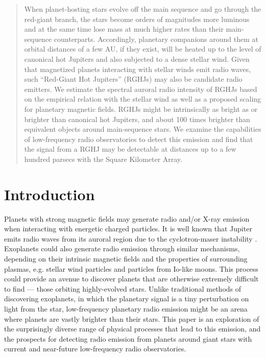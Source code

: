 \documentclass[iop,numberedappendix,apj,twocolappendix,]{emulateapj}
\begin{document}
\begin{abstract}
When planet-hosting stars evolve off the main sequence and go through the red-giant branch, the stars become orders of magnitudes more luminous and at the same time lose mass at much higher rates than their main-sequence counterparts.
Accordingly, planetary companions around them at orbital distances of a few AU, if they exist, will be heated up to the level of canonical hot Jupiters and also subjected to a dense stellar wind.
Given that magnetized planets interacting with stellar winds emit radio waves, such ``Red-Giant Hot Jupiters'' (RGHJs) may also be candidate radio emitters.
We estimate the spectral auroral radio intensity of RGHJs based on the empirical relation with the stellar wind as well as a proposed scaling for planetary magnetic fields. 
RGHJs might be intrinsically as bright as or brighter than canonical hot Jupiters, and about 100 times brighter than equivalent objects around main-sequence stars.
We examine the capabilities of low-frequency radio observatories to detect this emission and find that the signal from a RGHJ may be detectable at distances up to a few hundred parsecs with the Square Kilometer Array.
\end{abstract}

  


\section{Introduction}
\label{sec:intro}


Planets with strong magnetic fields may generate radio and/or X-ray emission when interacting with energetic charged particles. 
It is well known that Jupiter emits radio waves from its auroral region due to the cyclotron-maser instability \citep[e.g.][]{wu1979,zarka1998}.
Exoplanets could also generate radio emission through similar mechanisms, depending on their intrinsic magnetic fields and the properties of surrounding plasmas, e.g. stellar wind particles and particles from Io-like moons.
This process could provide an avenue to discover planets that are otherwise extremely difficult to find --- those orbiting highly-evolved stars.
Unlike traditional methods of discovering exoplanets, in which the planetary signal is a tiny perturbation on light from the star, low-frequency planetary radio emission might be an arena where planets are vastly brighter than their stars.
This paper is an exploration of the surprisingly diverse range of physical processes that lead to this emission, and the prospects for detecting radio emission from planets around giant stars with current and near-future low-frequency radio observatories.
\end{document}
